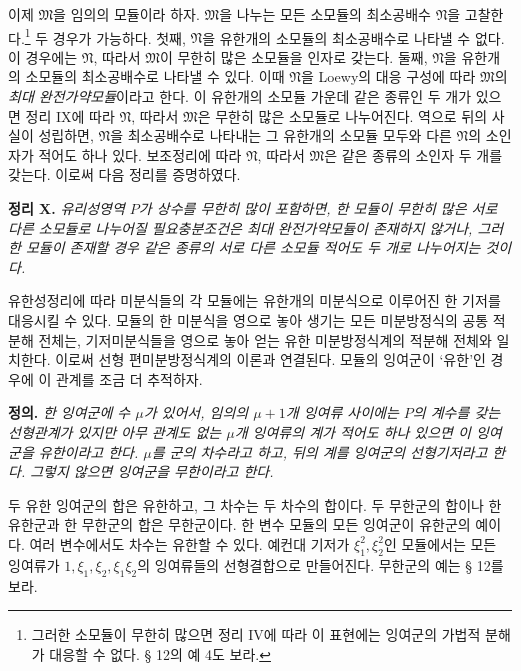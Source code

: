 이제 \(\mathfrak M\)을 임의의 모듈이라 하자. \(\mathfrak M\)을 나누는 모든 소모듈의 최소공배수 \(\mathfrak N\)을 고찰한다.\footnote{그러한 소모듈이 무한히 많으면 정리 IV에 따라 이 표현에는 잉여군의 가법적 분해가 대응할 수 없다. § 12의 예 4도 보라.} 두 경우가 가능하다. 첫째, \(\mathfrak N\)을 유한개의 소모듈의 최소공배수로 나타낼 수 없다. 이 경우에는 \(\mathfrak N\), 따라서 \(\mathfrak M\)이 무한히 많은 소모듈을 인자로 갖는다. 둘째, \(\mathfrak N\)을 유한개의 소모듈의 최소공배수로 나타낼 수 있다. 이때 \(\mathfrak N\)을 Loewy의 대응 구성에 따라 \(\mathfrak M\)의 \emph{최대 완전가약모듈}이라고 한다. 이 유한개의 소모듈 가운데 같은 종류인 두 개가 있으면 정리 IX에 따라 \(\mathfrak N\), 따라서 \(\mathfrak M\)은 무한히 많은 소모듈로 나누어진다. 역으로 뒤의 사실이 성립하면, \(\mathfrak N\)을 최소공배수로 나타내는 그 유한개의 소모듈 모두와 다른 \(\mathfrak N\)의 소인자가 적어도 하나 있다. 보조정리에 따라 \(\mathfrak N\), 따라서 \(\mathfrak M\)은 같은 종류의 소인자 두 개를 갖는다. 이로써 다음 정리를 증명하였다.

\textbf{정리 X.} \emph{유리성영역 \(P\)가 상수를 무한히 많이 포함하면, 한 모듈이 무한히 많은 서로 다른 소모듈로 나누어질 필요충분조건은 최대 완전가약모듈이 존재하지 않거나, 그러한 모듈이 존재할 경우 같은 종류의 서로 다른 소모듈 적어도 두 개로 나누어지는 것이다.}


유한성정리에 따라 미분식들의 각 모듈에는 유한개의 미분식으로 이루어진 한 기저를 대응시킬 수 있다. 모듈의 한 미분식을 영으로 놓아 생기는 모든 미분방정식의 공통 적분해 전체는, 기저미분식들을 영으로 놓아 얻는 유한 미분방정식계의 적분해 전체와 일치한다. 이로써 선형 편미분방정식계의 이론과 연결된다. 모듈의 잉여군이 ‘유한’인 경우에 이 관계를 조금 더 추적하자.

\textbf{정의.} \emph{한 잉여군에 수 \(\mu\)가 있어서, 임의의 \(\mu+1\)개 잉여류 사이에는 \(P\)의 계수를 갖는 선형관계가 있지만 아무 관계도 없는 \(\mu\)개 잉여류의 계가 적어도 하나 있으면 이 잉여군을 유한이라고 한다. \(\mu\)를 군의 차수라고 하고, 뒤의 계를 잉여군의 선형기저라고 한다. 그렇지 않으면 잉여군을 무한이라고 한다.}

두 유한 잉여군의 합은 유한하고, 그 차수는 두 차수의 합이다. 두 무한군의 합이나 한 유한군과 한 무한군의 합은 무한군이다. 한 변수 모듈의 모든 잉여군이 유한군의 예이다. 여러 변수에서도 차수는 유한할 수 있다. 예컨대 기저가 \(\xi_1^2,\xi_2^2\)인 모듈에서는 모든 잉여류가 \(1,\xi_1,\xi_2,\xi_1\xi_2\)의 잉여류들의 선형결합으로 만들어진다. 무한군의 예는 § 12를 보라.

